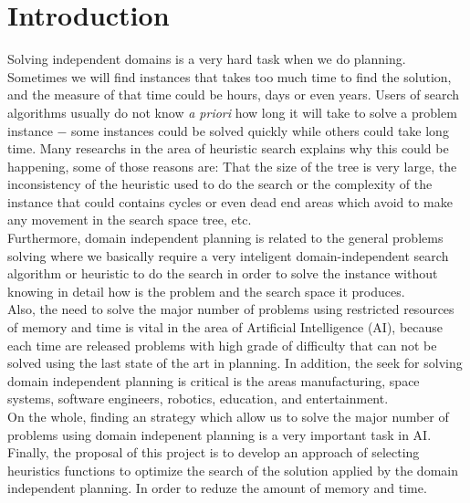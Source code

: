 \documentclass[11pt,a4paper,oneside]{report}
\begin{document}
\tableofcontents
\newpage

\section{Introduction}
Solving independent domains is a very hard task when we do planning. Sometimes we will find instances that takes too much time to find the solution, and the measure of that time could be hours, days or even years. Users of search algorithms usually do not know \textit{a priori} how long it will take to solve a problem instance $-$ some instances could be solved quickly while others could take long time. Many researchs in the area of heuristic search explains why this could be happening, some of those reasons are: That the size of the tree is very large, the inconsistency of the heuristic used to do the search or the complexity of the instance that could contains cycles or even dead end areas which avoid to make any movement in the search space tree, etc.\\

Furthermore, domain independent planning is related to the general problems solving where we basically require a very inteligent domain-independent search algorithm or heuristic to do the search in order to solve the instance without knowing in detail how is the problem and the search space it produces.\\

Also, the need to solve the major number of problems using restricted resources of memory and time is vital in the area of Artificial Intelligence (AI), because each time are released problems with high grade of difficulty that can not be solved using the last state of the art in planning. In addition, the seek for solving domain independent planning is critical is the areas manufacturing, space systems, software engineers, robotics, education, and entertainment.\\

On the whole, finding an strategy which allow us to solve the major number of problems using domain indepenent planning is a very important task in AI.\\

Finally, the proposal of this project is to develop an approach of selecting heuristics functions to optimize the search of the solution applied by the domain independent planning. In order to reduze the amount of memory and time.
\end{document}
